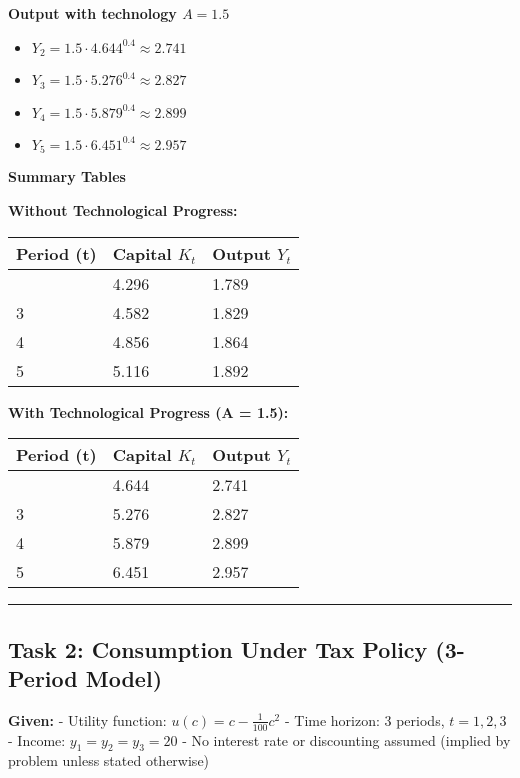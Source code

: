 \documentclass[
]{article}
\providecommand{\tightlist}{%
  \setlength{\itemsep}{0pt}\setlength{\parskip}{0pt}}
\begin{document}
\textbf{Output with technology \(A = 1.5\)}

\begin{itemize}
\tightlist
\item
  \(Y_2 = 1.5 \cdot 4.644^{0.4} \approx 2.741\)
\item
  \(Y_3 = 1.5 \cdot 5.276^{0.4} \approx 2.827\)
\item
  \(Y_4 = 1.5 \cdot 5.879^{0.4} \approx 2.899\)
\item
  \(Y_5 = 1.5 \cdot 6.451^{0.4} \approx 2.957\)
\end{itemize}

\textbf{Summary Tables}

\textbf{Without Technological Progress:}

\begin{longtable}[]{@{}lll@{}}
\toprule\noalign{}
Period (t) & Capital \(K_t\) & Output \(Y_t\) \\
\midrule\noalign{}
\endhead
\bottomrule\noalign{}
\endlastfoot
2 & 4.296 & 1.789 \\
3 & 4.582 & 1.829 \\
4 & 4.856 & 1.864 \\
5 & 5.116 & 1.892 \\
\end{longtable}

\textbf{With Technological Progress (A = 1.5):}

\begin{longtable}[]{@{}lll@{}}
\toprule\noalign{}
Period (t) & Capital \(K_t\) & Output \(Y_t\) \\
\midrule\noalign{}
\endhead
\bottomrule\noalign{}
\endlastfoot
2 & 4.644 & 2.741 \\
3 & 5.276 & 2.827 \\
4 & 5.879 & 2.899 \\
5 & 6.451 & 2.957 \\
\end{longtable}

\begin{center}\rule{0.5\linewidth}{0.5pt}\end{center}

\subsection{Task 2: Consumption Under Tax Policy (3-Period
Model)}\label{task-2-consumption-under-tax-policy-3-period-model}

\textbf{Given:} - Utility function: \(u(c) = c - \frac{1}{100}c^2\) -
Time horizon: 3 periods, \(t = 1, 2, 3\) - Income:
\(y_1 = y_2 = y_3 = 20\) - No interest rate or discounting assumed
(implied by problem unless stated otherwise)
\end{document}
